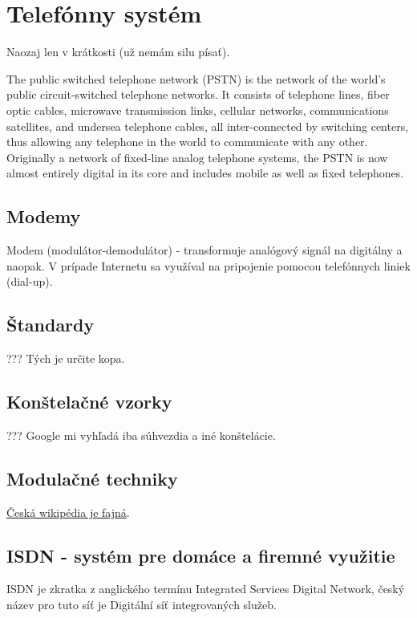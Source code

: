 \documentclass[10pt,a4paper]{article}
\begin{document}
\section{Telefónny systém}  
Naozaj len v krátkosti (už nemám silu písať). 

The public switched telephone network (PSTN) is the network of the world's public circuit-switched telephone networks. It consists of telephone lines, fiber optic cables, microwave transmission links, cellular networks, communications satellites, and undersea telephone cables, all inter-connected by switching centers, thus allowing any telephone in the world to communicate with any other. Originally a network of fixed-line analog telephone systems, the PSTN is now almost entirely digital in its core and includes mobile as well as fixed telephones.
  
\subsection{Modemy}      
Modem (modulátor-demodulátor) - transformuje analógový signál na digitálny a naopak. V prípade Internetu sa využíval na pripojenie pomocou telefónnych liniek (dial-up).

\subsection{Štandardy}    
??? Tých je určite kopa. 

\subsection{Konštelačné vzorky}  
??? Google mi vyhľadá iba súhvezdia a iné konštelácie. 

\subsection{Modulačné techniky}   
\href{http://cs.wikipedia.org/wiki/Modulace}{Česká wikipédia je fajná}. 

\subsection{ISDN - systém pre domáce a firemné využitie}  
ISDN je zkratka z anglického termínu Integrated Services Digital Network, český název pro tuto síť je Digitální síť integrovaných služeb.
\end{document}
